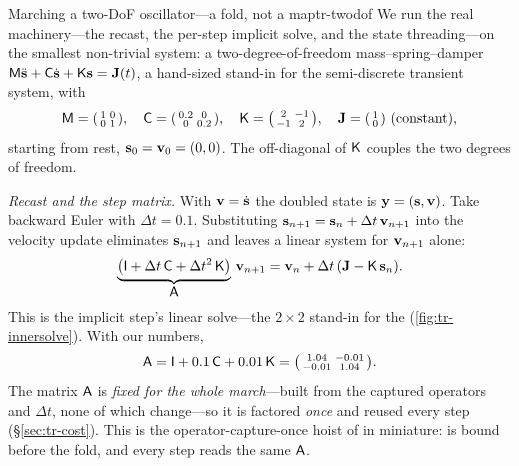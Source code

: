 \begin{workedexample}{Marching a two-DoF oscillator---a fold, not a map}{tr-twodof}
We run the real machinery---the recast, the per-step implicit solve, and the state
threading---on the smallest non-trivial system: a two-degree-of-freedom
mass--spring--damper $\mathsf{M}\ddot{\mathbf{s}}+\mathsf{C}\dot{\mathbf{s}}+\mathsf{K}\mathbf{s}=\mathbf{J}(t)$, a hand-sized
stand-in for the semi-discrete transient system, with
\[
  \Mop=\begin{psmallmatrix}1&0\\0&1\end{psmallmatrix},\quad
  \Cop=\begin{psmallmatrix}0.2&0\\0&0.2\end{psmallmatrix},\quad
  \Kop=\begin{psmallmatrix}2&-1\\-1&2\end{psmallmatrix},\quad
  \vJ=\begin{psmallmatrix}1\\0\end{psmallmatrix}\ (\text{constant}),
\]
starting from rest, $\mathbf{s}_0=\mathbf{v}_0=(0,0)$. The off-diagonal of $\mathsf{K}$ couples the two
degrees of freedom.

\medskip
\emph{Recast and the step matrix.} With $\mathbf{v}=\dot{\mathbf{s}}$ the doubled state is
$\mathbf{y}=(\mathbf{s},\mathbf{v})$. Take backward Euler with $\Delta t=0.1$. Substituting
$\mathbf{s}_{n+1}=\mathbf{s}_n+\Delta t\,\mathbf{v}_{n+1}$ into the velocity update eliminates
$\mathbf{s}_{n+1}$ and leaves a linear system for $\mathbf{v}_{n+1}$ alone:
\[
  \underbrace{\bigl(\mathsf{I}+\Delta t\,\mathsf{C}+\Delta t^2\,\mathsf{K}\bigr)}_{\displaystyle\mathsf{A}}
  \,\mathbf{v}_{n+1}=\mathbf{v}_n+\Delta t\,(\mathbf{J}-\mathsf{K}\,\mathbf{s}_n).
\]
This is the implicit step's linear solve---the $2\times2$ stand-in for the
 (\cref{fig:tr-innersolve}). With our numbers,
\[
  \mathsf{A}=\mathsf{I}+0.1\,\mathsf{C}+0.01\,\mathsf{K}
        =\begin{psmallmatrix}1.04&-0.01\\-0.01&1.04\end{psmallmatrix}.
\]
The matrix $\mathsf{A}$ is \emph{fixed for the whole march}---built from the captured
operators and $\Delta t$, none of which change---so it is factored \emph{once} and
reused every step (\S\ref{sec:tr-cost}). This is the operator-capture-once hoist of
 in miniature:  is bound before the fold, and every step
reads the same $\mathsf{A}$.


\end{workedexample}
